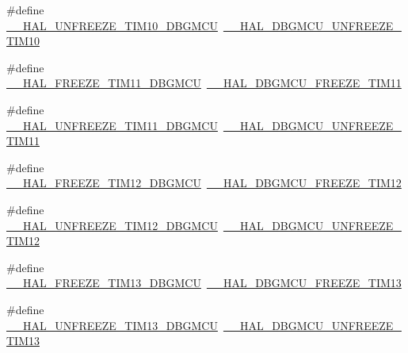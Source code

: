\begin{DoxyCompactItemize}
\item 
\#define \hyperlink{group___h_a_l___d_b_g_m_c_u___aliased___macros_ga2d2973e29dc79b768084c8dd20a51902}{\+\_\+\+\_\+\+H\+A\+L\+\_\+\+U\+N\+F\+R\+E\+E\+Z\+E\+\_\+\+T\+I\+M10\+\_\+\+D\+B\+G\+M\+CU}~\hyperlink{group___h_a_l___exported___macros_gaa63c03a742fa4728b49077514189b318}{\+\_\+\+\_\+\+H\+A\+L\+\_\+\+D\+B\+G\+M\+C\+U\+\_\+\+U\+N\+F\+R\+E\+E\+Z\+E\+\_\+\+T\+I\+M10}
\item 
\#define \hyperlink{group___h_a_l___d_b_g_m_c_u___aliased___macros_gac8155a6100bda9e15b5980c6a3bfee95}{\+\_\+\+\_\+\+H\+A\+L\+\_\+\+F\+R\+E\+E\+Z\+E\+\_\+\+T\+I\+M11\+\_\+\+D\+B\+G\+M\+CU}~\hyperlink{group___h_a_l___exported___macros_gac1f554993a6d5c7a953dab2c6cc564dd}{\+\_\+\+\_\+\+H\+A\+L\+\_\+\+D\+B\+G\+M\+C\+U\+\_\+\+F\+R\+E\+E\+Z\+E\+\_\+\+T\+I\+M11}
\item 
\#define \hyperlink{group___h_a_l___d_b_g_m_c_u___aliased___macros_ga38be002f00b5e705d536fd044961ad79}{\+\_\+\+\_\+\+H\+A\+L\+\_\+\+U\+N\+F\+R\+E\+E\+Z\+E\+\_\+\+T\+I\+M11\+\_\+\+D\+B\+G\+M\+CU}~\hyperlink{group___h_a_l___exported___macros_gae6396470b3bddff9424201bf07573f19}{\+\_\+\+\_\+\+H\+A\+L\+\_\+\+D\+B\+G\+M\+C\+U\+\_\+\+U\+N\+F\+R\+E\+E\+Z\+E\+\_\+\+T\+I\+M11}
\item 
\#define \hyperlink{group___h_a_l___d_b_g_m_c_u___aliased___macros_ga26cc09be3020aa8006a2a4db51708af5}{\+\_\+\+\_\+\+H\+A\+L\+\_\+\+F\+R\+E\+E\+Z\+E\+\_\+\+T\+I\+M12\+\_\+\+D\+B\+G\+M\+CU}~\hyperlink{group___h_a_l___exported___macros_ga2bbe99ec741228b520e17b1bf38eb2ad}{\+\_\+\+\_\+\+H\+A\+L\+\_\+\+D\+B\+G\+M\+C\+U\+\_\+\+F\+R\+E\+E\+Z\+E\+\_\+\+T\+I\+M12}
\item 
\#define \hyperlink{group___h_a_l___d_b_g_m_c_u___aliased___macros_ga5b17b5b165b725d296edbce1d57f96b9}{\+\_\+\+\_\+\+H\+A\+L\+\_\+\+U\+N\+F\+R\+E\+E\+Z\+E\+\_\+\+T\+I\+M12\+\_\+\+D\+B\+G\+M\+CU}~\hyperlink{group___h_a_l___exported___macros_gaa8e882be8db24537679bc0d4a129f448}{\+\_\+\+\_\+\+H\+A\+L\+\_\+\+D\+B\+G\+M\+C\+U\+\_\+\+U\+N\+F\+R\+E\+E\+Z\+E\+\_\+\+T\+I\+M12}
\item 
\#define \hyperlink{group___h_a_l___d_b_g_m_c_u___aliased___macros_ga958f177a783994c955ac53d010c83c84}{\+\_\+\+\_\+\+H\+A\+L\+\_\+\+F\+R\+E\+E\+Z\+E\+\_\+\+T\+I\+M13\+\_\+\+D\+B\+G\+M\+CU}~\hyperlink{group___h_a_l___exported___macros_ga21bfaea50e429031982861b2869c6863}{\+\_\+\+\_\+\+H\+A\+L\+\_\+\+D\+B\+G\+M\+C\+U\+\_\+\+F\+R\+E\+E\+Z\+E\+\_\+\+T\+I\+M13}
\item 
\#define \hyperlink{group___h_a_l___d_b_g_m_c_u___aliased___macros_ga3011a6972f4002f1a80635ccc46f6382}{\+\_\+\+\_\+\+H\+A\+L\+\_\+\+U\+N\+F\+R\+E\+E\+Z\+E\+\_\+\+T\+I\+M13\+\_\+\+D\+B\+G\+M\+CU}~\hyperlink{group___h_a_l___exported___macros_ga00b605f660d43ab1b833926dabe352fe}{\+\_\+\+\_\+\+H\+A\+L\+\_\+\+D\+B\+G\+M\+C\+U\+\_\+\+U\+N\+F\+R\+E\+E\+Z\+E\+\_\+\+T\+I\+M13}

\end{DoxyCompactItemize}
